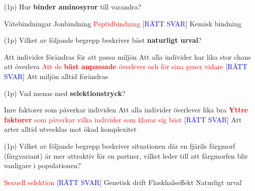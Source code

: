 \documentclass{exam}
\begin{document}
\begin{questions}
\question (1p) Hur \textbf{binder aminosyror} till varandra?
\begin{checkboxes}
   \choice Vätebindningar
   \choice Jonbindning
   \correctchoice \textcolor{red}{Peptidbindning} \textcolor{blue}{[RÄTT SVAR]}
   \choice Kemisk bindning
\end{checkboxes}
\vspace{5mm}

\question (1p) Vilket av följande begrepp beskriver bäst \textbf{naturligt urval}?
\begin{checkboxes}
    \choice Att individer förändras för att passa miljön
    \choice Att alla individer har lika stor chans att överleva
    \correctchoice \textcolor{red}{Att de \textbf{bäst anpassade} överlever och för sina gener vidare} \textcolor{blue}{[RÄTT SVAR]}
    \choice Att miljön alltid förändras
\end{checkboxes}
\vspace{5mm}

\question (1p) Vad menas med \textbf{selektionstryck}?
\begin{checkboxes}
    \choice Inre faktorer som påverkar individen
    \choice Att alla individer överlever lika bra
    \correctchoice \textcolor{red}{\textbf{Yttre faktorer} som påverkar vilka individer som klarar sig bäst} \textcolor{blue}{[RÄTT SVAR]}
    \choice Att arter alltid utvecklas mot ökad komplexitet
\end{checkboxes}
\vspace{5mm}

\question (1p) Vilket av följande begrepp beskriver situationen där en fjärils färgmorf (färgvariant) är mer attraktiv för en partner, vilket leder till att färgmorfen blir vanligare i populationen?
\begin{checkboxes}
    \correctchoice \textcolor{red}{Sexuell selektion} \textcolor{blue}{[RÄTT SVAR]}
    \choice Genetisk drift
    \choice Flaskhalseffekt
    \choice Naturligt urval
\end{checkboxes}
\vspace{5mm}


\end{questions}
\end{document}
